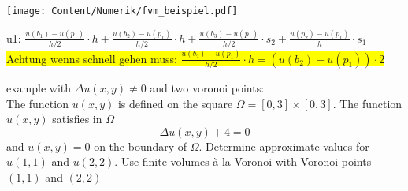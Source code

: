\begin{minipage}{6cm}
  \texttt{[image: Content/Numerik/fvm\_beispiel.pdf]}
\end{minipage}
\hfill
\begin{minipage}{12cm}

  u1: $\frac{u(b_1) - u(p_1)}{h/2} \cdot h + \frac{u(b_2) - u(p_1)}{h/2} \cdot h +
    \frac{u(b_3) - u(p_1)}{h/2} \cdot s_2 + \frac{u(p_2) - u(p_1)}{h} \cdot s_1 $\\
  \colorbox{yellow}{Achtung wenns schnell gehen muss: $\frac{u(b_2) - u(p_1)}{h/2}
      \cdot h = (u(b_2) - u(p_1)) \cdot 2$}

\end{minipage}

example with $\Delta u(x,y) \neq 0$ and two voronoi points: \\
The function $u(x,y)$ is defined on the square $\Omega =[0,3]\times [0,3]$. The function $u(x,y)$ satisfies in $\Omega$ $$  \Delta u(x,y)+4=0 $$ and $u(x,y)=0$ on the boundary of $\Omega$. Determine approximate values for $u(1,1)$ and $u(2,2)$. Use finite volumes à la Voronoi with Voronoi-points $(1,1)$ and $(2,2)$



